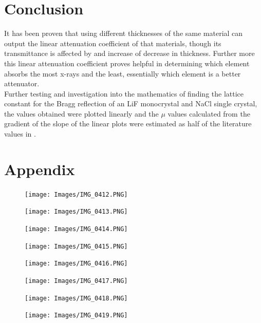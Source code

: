 \documentclass[12pt]{article}
\begin{document}
\section{Conclusion}
\label{Conclusion Section}

It has been proven that using different thicknesses of the same material can output the linear attenuation coefficient of that materials, though its transmittance is affected by and increase of decrease in thickness. Further more this linear attenuation coefficient proves helpful in determining which element absorbs the most x-rays and the least, essentially which element is a better attenuator.  \\

Further testing and investigation into the mathematics of finding the lattice constant for the Bragg reflection of an LiF monocrystal and NaCl single crystal, the values obtained were plotted linearly and the $\mu$ values calculated from the gradient of the slope of the linear plots were estimated as half of the literature values in \cite{CRC}.

\newpage
\section{Appendix}
\label{Appendix Section}

\begin{figure}[H]
\centering
\texttt{[image: Images/IMG\_0412.PNG]}
\end{figure}
\newpage
\begin{figure}[H]
\centering
\texttt{[image: Images/IMG\_0413.PNG]}
\end{figure}
\newpage
\begin{figure}[H]
\centering
\texttt{[image: Images/IMG\_0414.PNG]}
\end{figure}
\newpage
\begin{figure}[H]
\centering
\texttt{[image: Images/IMG\_0415.PNG]}
\end{figure}
\newpage
\begin{figure}[H]
\centering
\texttt{[image: Images/IMG\_0416.PNG]}
\end{figure}
\newpage
\begin{figure}[H]
\centering
\texttt{[image: Images/IMG\_0417.PNG]}
\end{figure}
\newpage
\begin{figure}[H]
\centering
\texttt{[image: Images/IMG\_0418.PNG]}
\end{figure}
\newpage
\begin{figure}[H]
\centering
\texttt{[image: Images/IMG\_0419.PNG]}
\end{figure}


\end{document}
